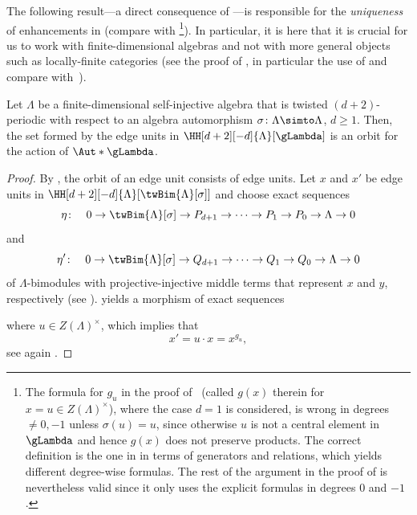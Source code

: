 \documentclass[a4paper]{amsart}
\begin{document}
  The following result---a direct consequence of
  ---is responsible for the
  \emph{uniqueness} of enhancements in  (compare with
  \cite[Prop.~9.4]{Mur22}\footnote{The formula for $g_u$ in the proof
    of~\cite[Prop.~9.4]{Mur22} (called $g(x)$ therein for $x=u\in
    Z(\Lambda)^\times$), where the case $d=1$ is considered, is wrong in degrees
    $\neq 0,-1$ unless $\sigma(u)=u$, since otherwise $u$ is not a central
    element in $\gLambda$ and hence $g(x)$ does not preserve products. The correct definition is the one in  in terms of generators and relations, which yields different degree-wise formulas. The rest of the argument in the proof of \cite[Prop.~9.4]{Mur22} is nevertheless valid since it only uses the explicit formulas in degrees $0$ and $-1$.}). In particular, it is here that it is crucial for us
  to work with finite-dimensional algebras and not with more general objects
  such as locally-finite categories (see the proof of
  , in particular the use of
  \cite[Cor.~2.3]{Che21} and compare with~).

\begin{proposition}
  \label{prop:single_orbit}
  Let $\Lambda$ be a finite-dimensional self-injective algebra that is twisted
  $(d+2)$-periodic with respect to an algebra automorphism
  $\sigma\colon\Lambda\simto\Lambda$, $d\geq 1$. Then, the set formed by the
  edge units in $\HH[d+2][-d]{\Lambda}[\gLambda]$ is an orbit for
  the action of $\Aut*{\gLambda}$.
\end{proposition}
\begin{proof}
  By , the orbit of an edge unit consists of edge units. 
  Let $x$ and $x'$ be edge units in
  $\HH[d+2][-d]{\Lambda}[\twBim{\Lambda}[\sigma]]$ and choose exact sequences
  \[
    \eta\colon\quad 0\to\twBim{\Lambda}[\sigma]\to P_{d+1}\to\cdots\to P_1\to
    P_0\to\Lambda\to0
  \]
  and
  \[
    \eta'\colon\quad 0\to\twBim{\Lambda}[\sigma]\to Q_{d+1}\to\cdots\to Q_1\to
    Q_0\to\Lambda\to0
  \]
  of $\Lambda$-bimodules with projective-injective middle terms that represent
  $x$ and $y$, respectively (see ).
   yields a morphism of exact sequences
  \begin{center}
  \end{center}
  where $u\in Z(\Lambda)^\times$, which implies that
  \[
    x'=u\cdot x=x^{g_u},
  \]
  see again .
\end{proof}
\end{document}
